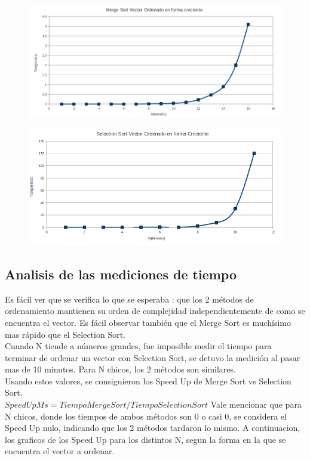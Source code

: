 \begin{figure}[!htp]
\begin{center}
\includegraphics[width=12cm]{Imagenes/MergeSortOrdenadocreciente.PNG}
\end{center}
\end{figure} 

\begin{figure}[!htp]
\begin{center}
\includegraphics[width=12cm]{Imagenes/SelectionSortordenadocreciente.PNG}
\end{center}
\end{figure} 

\newpage


\subsection{Analisis de las mediciones de tiempo}
Es fácil ver que se verifica lo que se esperaba : que los 2 métodos de ordenamiento mantienen su orden de complejidad independientemente
de como se encuentra el vector. Es fácil observar también que el Merge Sort es muchísimo mas rápido que el Selection Sort.
\\Cuando N tiende a números grandes, fue imposible medir el tiempo para terminar de ordenar un vector con Selection Sort, se detuvo la medición al pasar mas de 10 minutos. Para N chicos, los 2 métodos son similares.
\\Usando estos valores, se consiguieron los Speed Up de Merge Sort vs Selection Sort.
\\$SpeedUpMs=TiempoMergeSort/TiempoSelectionSort$
Vale mencionar que para N chicos, donde los tiempos de ambos métodos son 0 o casi 0, se considera el Speed Up nulo, indicando que los 2 métodos tardaron lo mismo.
A continuacion, los graficos de los Speed Up para los distintos N, segun la forma en la que se encuentra el vector a ordenar.

